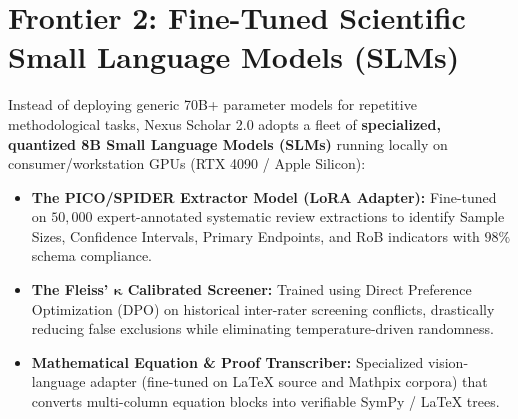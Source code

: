 \documentclass[10pt,a4paper]{article}
\begin{document}
\begin{center}
\end{center}
\vspace{-4pt}

\section{Frontier 2: Fine-Tuned Scientific Small Language Models (SLMs)}

Instead of deploying generic 70B+ parameter models for repetitive methodological tasks, Nexus Scholar 2.0 adopts a fleet of \textbf{specialized, quantized 8B Small Language Models (SLMs)} running locally on consumer/workstation GPUs (RTX 4090 / Apple Silicon):

\begin{itemize}[leftmargin=1.4em, itemsep=2pt, topsep=2pt]
    \item \textbf{The PICO/SPIDER Extractor Model (LoRA Adapter):} Fine-tuned on $50{,}000$ expert-annotated systematic review extractions to identify Sample Sizes, Confidence Intervals, Primary Endpoints, and RoB indicators with $98\%$ schema compliance.
    \item \textbf{The Fleiss' $\boldsymbol{\kappa}$ Calibrated Screener:} Trained using Direct Preference Optimization (DPO) on historical inter-rater screening conflicts, drastically reducing false exclusions while eliminating temperature-driven randomness.
    \item \textbf{Mathematical Equation \& Proof Transcriber:} Specialized vision-language adapter (fine-tuned on LaTeX source and Mathpix corpora) that converts multi-column equation blocks into verifiable SymPy / LaTeX trees.
\end{itemize}
\end{document}
